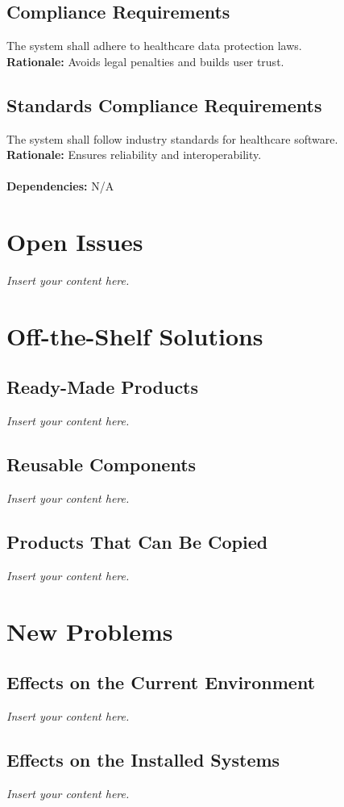 \documentclass[12pt]{article}
\newcommand{\lips}{\textit{Insert your content here.}}
\begin{document}
\subsection{Compliance Requirements}
The system shall adhere to healthcare data protection laws.  \\
\textbf{Rationale:} Avoids legal penalties and builds user trust.

\subsection{Standards Compliance Requirements}
The system shall follow industry standards for healthcare software.  \\
\textbf{Rationale:} Ensures reliability and interoperability. \\
  \\
\textbf{Dependencies:} N/A

\section{Open Issues}
\lips

\section{Off-the-Shelf Solutions}
\subsection{Ready-Made Products}
\lips
\subsection{Reusable Components}
\lips
\subsection{Products That Can Be Copied}
\lips

\section{New Problems}
\subsection{Effects on the Current Environment}
\lips
\subsection{Effects on the Installed Systems}
\lips
\end{document}
